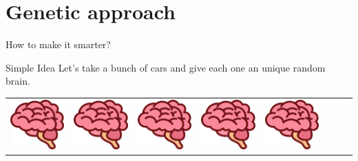 \documentclass{do}
\begin{document}
\section{Genetic approach}


\begin{frame}{How to make it smarter?}
    \begin{exampleblock}{Simple Idea}
        \centering
        \small{Let’s take a bunch of cars and give each one an unique random brain.}
        \hfill
        \begin{tabular}{c|c|c|c|c|c|c|c}
            \includegraphics[scale=0.66]{brain0.png}&
            \includegraphics[scale=0.66]{brain0.png}&
            \includegraphics[scale=0.66]{brain0.png}&
            \includegraphics[scale=0.66]{brain0.png}&
            \includegraphics[scale=0.66]{brain0.png}&

\end{tabular}
\end{exampleblock}
\end{frame}
\end{document}
